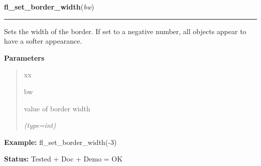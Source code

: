 \hspace{.8\funcindent}\begin{boxedminipage}{\funcwidth}

    \raggedright \textbf{fl\_set\_border\_width}(\textit{bw})

    \vspace{-1.5ex}

    \rule{\textwidth}{0.5\fboxrule}
\setlength{\parskip}{2ex}
    Sets the width of the border. If set to a negative number, all objects 
    appear to have a softer appearance.

\setlength{\parskip}{1ex}
      \textbf{Parameters}
      \vspace{-1ex}

      \begin{quote}
        \begin{Ventry}{xx}

          \item[bw]

          value of border width

            {\it (type=int)}

        \end{Ventry}

      \end{quote}

\textbf{Example:} fl\_set\_border\_width(-3)



\textbf{Status:} Tested + Doc + Demo = OK



    \end{boxedminipage}

    \label{xformslib:flbasic:fl_set_scrollbar_type}

    \vspace{0.5ex}

